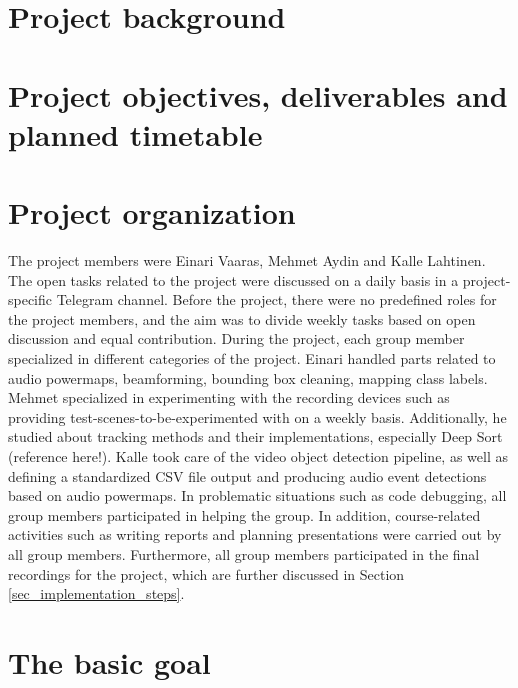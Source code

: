 \section{Project background}

\section{Project objectives, deliverables and planned timetable}

\section{Project organization}

The project members were Einari Vaaras, Mehmet Aydin and Kalle Lahtinen. The open tasks related to the project were discussed on a daily basis in a project-specific Telegram channel. Before the project, there were no predefined roles for the project members, and the aim was to divide weekly tasks based on open discussion and equal contribution. During the project, each group member specialized in different categories of the project. Einari handled parts related to audio powermaps, beamforming, bounding box cleaning, mapping class labels. Mehmet specialized in experimenting with the recording devices such as providing test-scenes-to-be-experimented with on a weekly basis. Additionally, he studied about tracking methods and their implementations, especially Deep Sort (reference here!). Kalle took care of the video object detection pipeline, as well as defining a standardized CSV file output and producing audio event detections based on audio powermaps. In problematic situations such as code debugging, all group members participated in helping the group. In addition, course-related activities such as writing reports and planning presentations were carried out by all group members. Furthermore, all group members participated in the final recordings for the project, which are further discussed in Section \ref{sec_implementation_steps}.

\section{The basic goal}